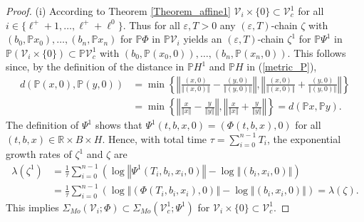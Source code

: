 	\begin{proof}
		(i) According to Theorem \ref{Theorem_affine1} $\mathcal{V}_{i}\times
		\{0\}\subset\mathcal{V}_{c}^{1}$ for all $i\in\{\ell^{+}+1,\ldots,\ell
		^{+}+\ell^{0}\}$. Thus for all $\varepsilon,T>0$ any $(\varepsilon,T)$-chain
		$\zeta$ with $(b_{0},\mathbb{P}x_{0}),\ldots,(b_{n},\mathbb{P}x_{n})$ for
		$\mathbb{P}\Phi$ in $\mathbb{P}\mathcal{V}_{i}$ yields an $(\varepsilon
		,T)$-chain $\zeta^{1}$ for $\mathbb{P}\Psi^{1}$ in $\mathbb{P}\left(
		\mathcal{V}_{i}\times\{0\}\right)  \subset\mathbb{P}\mathcal{V}_{c}^{1}$ with
		$(b_{0},\mathbb{P}(x_{0},0)),\ldots,\allowbreak(b_{n},\mathbb{P}(x_{n},0))$.
		This follows since, by the definition of the distance in $\mathbb{P}H^{1}$ and
		$\mathbb{P}H$ in (\ref{metric_P}),
		\begin{align*}
			d(\mathbb{P}(x,0),\mathbb{P}(y,0))  &  =\min\left\{  \left\Vert \frac
			{(x,0)}{\left\Vert (x,0)\right\Vert }-\frac{(y,0)}{\left\Vert (y,0)\right\Vert
			}\right\Vert ,\left\Vert \frac{(x,0)}{\left\Vert (x,0)\right\Vert }%
			+\frac{(y,0)}{\left\Vert (y,0)\right\Vert }\right\Vert \right\} \\
			&  =\min\left\{  \left\Vert \frac{x}{\left\Vert x\right\Vert }-\frac
			{y}{\left\Vert y\right\Vert }\right\Vert ,\left\Vert \frac{x}{\left\Vert
				x\right\Vert }+\frac{y}{\left\Vert y\right\Vert }\right\Vert \right\}
			=d(\mathbb{P}x,\mathbb{P}y).
		\end{align*}
		The definition of $\Psi^{1}$ shows that $\Psi^{1}(t,b,x,0)=(\Phi(t,b,x),0)$
		for all $(t,b,x)\in\mathbb{R}\times B\times H$. Hence, with total time
		$\tau=\sum_{i=0}^{n-1}T_{i}$, the exponential growth rates of $\zeta^{1}$ and
		$\zeta$ are
		\begin{align*}
			\lambda(\zeta^{1})  &  =\frac{1}{\tau}\sum_{i=0}^{n-1}\left(  \log\left\Vert
			\Psi^{1}(T_{i},b_{i},x_{i},0)\right\Vert -\log\left\Vert (b_{i},x_{i}%
			,0)\right\Vert \right) \\
			&  =\frac{1}{\tau}\sum_{i=0}^{n-1}\left(  \log\left\Vert (\Phi(T_{i}%
			,b_{i},x_{i}),0)\right\Vert -\log\left\Vert (b_{i},x_{i},0)\right\Vert
			\right)  =\lambda(\zeta).
		\end{align*}
		This implies $\Sigma_{Mo}(\mathcal{V}_{i};\Phi)\subset\Sigma_{Mo}%
		(\mathcal{V}_{c}^{1};\Psi^{1})$ for $\mathcal{V}_{i}\times\{0\}\subset
		\mathcal{V}_{c}^{1}$.
		

\end{proof}
